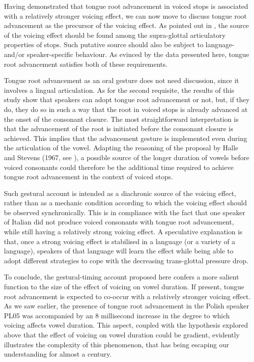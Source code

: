 \documentclass[authoryear, twocolumn]{elsarticle}
\begin{document}
Having demonstrated that tongue root advancement in voiced stops is
associated with a relatively stronger voicing effect, we can now move to
discuss tongue root advancement as the precursor of the voicing effect.
As pointed out in , the source of the voicing effect
should be found among the supra-glottal articulatory properties of
stops. Such putative source should also be subject to language- and/or
speaker-specific behaviour. As evinced by the data presented here,
tongue root advancement satisfies both of these requirements.

Tongue root advancement as an oral gesture does not need discussion,
since it involves a lingual articulation. As for the second requisite,
the results of this study show that speakers can adopt tongue root
advancement or not, but, if they do, they do so in such a way that the
root in voiced stops is already advanced at the onset of the consonant
closure. The most straightforward interpretation is that the advancement
of the root is initiated before the consonant closure is achieved. This
implies that the advancement gesture is implemented even during the
articulation of the vowel. Adapting the reasoning of the proposal by
Halle and Stevens (1967, see ), a possible source of the
longer duration of vowels before voiced consonants could therefore be
the additional time required to achieve tongue root advancement in the
context of voiced stops.

Such gestural account is intended as a diachronic source of the voicing
effect, rather than as a mechanic condition according to which the
voicing effect should be observed synchronically. This is in compliance
with the fact that one speaker of Italian did not produce voiced
consonants with tongue root advancement, while still having a relatively
strong voicing effect. A speculative explanation is that, once a strong
voicing effect is stabilised in a language (or a variety of a language),
speakers of that language will learn the effect while being able to
adopt different strategies to cope with the decreasing trans-glottal
pressure drop.

To conclude, the gestural-timing account proposed here confers a more
salient function to the size of the effect of voicing on vowel duration.
If present, tongue root advancement is expected to co-occur with a
relatively stronger voicing effect. As we saw earlier, the presence of
tongue root advancement in the Polish speaker PL05 was accompanied by an
8 millisecond increase in the degree to which voicing affects vowel
duration. This aspect, coupled with the hypothesis explored above that
the effect of voicing on vowel duration could be gradient, evidently
illustrates the complexity of this phenomenon, that has being escaping
our understanding for almost a century.
\end{document}
